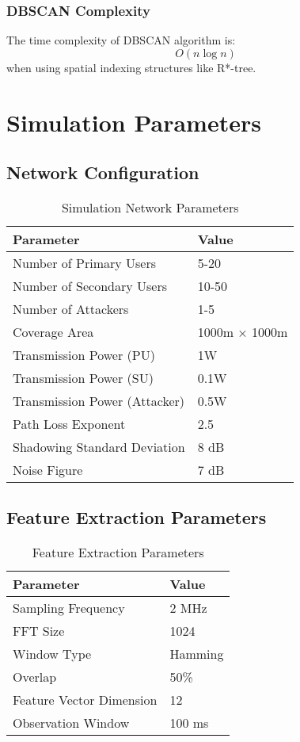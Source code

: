 \subsection{DBSCAN Complexity}
The time complexity of DBSCAN algorithm is:
\begin{equation}
O(n \log n)
\end{equation}
when using spatial indexing structures like R*-tree.

\chapter{Simulation Parameters}
\label{app:sim_params}

\section{Network Configuration}
\label{app:network_config}

\begin{table}[h]
\centering
\caption{Simulation Network Parameters}
\label{tab:network_params}
\begin{tabular}{@{}ll@{}}
\toprule
Parameter & Value \\
\midrule
Number of Primary Users & 5-20 \\
Number of Secondary Users & 10-50 \\
Number of Attackers & 1-5 \\
Coverage Area & 1000m × 1000m \\
Transmission Power (PU) & 1W \\
Transmission Power (SU) & 0.1W \\
Transmission Power (Attacker) & 0.5W \\
Path Loss Exponent & 2.5 \\
Shadowing Standard Deviation & 8 dB \\
Noise Figure & 7 dB \\
\bottomrule
\end{tabular}
\end{table}

\section{Feature Extraction Parameters}
\label{app:feature_params}

\begin{table}[h]
\centering
\caption{Feature Extraction Parameters}
\label{tab:feature_params}
\begin{tabular}{@{}ll@{}}
\toprule
Parameter & Value \\
\midrule
Sampling Frequency & 2 MHz \\
FFT Size & 1024 \\
Window Type & Hamming \\
Overlap & 50\% \\
Feature Vector Dimension & 12 \\
Observation Window & 100 ms \\
\bottomrule
\end{tabular}
\end{table}

